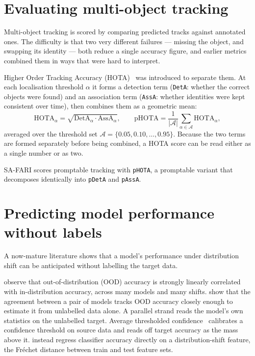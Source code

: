 \section{Evaluating multi-object tracking}
\label{sec:bg-hota}
Multi-object tracking is scored by comparing predicted tracks against annotated ones. The difficulty is that
two very different failures --- missing the object, and swapping its identity --- both reduce a single
accuracy figure, and earlier metrics combined them in ways that were hard to interpret.

Higher Order Tracking Accuracy (HOTA)~\cite{hota} was introduced to separate them. At each localisation
threshold $\alpha$ it forms a detection term (\texttt{DetA}: whether the correct objects were found) and an
association term (\texttt{AssA}: whether identities were kept consistent over time), then combines them as a
geometric mean:
\begin{equation}
  \mathrm{HOTA}_\alpha=\sqrt{\mathrm{DetA}_\alpha\cdot\mathrm{AssA}_\alpha},
  \qquad
  \mathrm{pHOTA}=\frac{1}{|\mathcal{A}|}\sum_{\alpha\in\mathcal{A}}\mathrm{HOTA}_\alpha ,
  \label{eq:phota}
\end{equation}
averaged over the threshold set $\mathcal{A}=\{0.05,0.10,\dots,0.95\}$. Because the two terms are formed
separately before being combined, a HOTA score can be read either as a single number or as two.

SA-FARI scores promptable tracking with \texttt{pHOTA}, a promptable variant that decomposes identically into
\texttt{pDetA} and \texttt{pAssA}.

\section{Predicting model performance without labels}
\label{sec:bg-predictable}
A now-mature literature shows that a model's performance under distribution shift can be anticipated without
labelling the target data.

\citet{aotl} observe that out-of-distribution (OOD) accuracy is strongly linearly correlated with
in-distribution accuracy, across many models and many shifts. \citet{agl} show that the agreement between a
pair of models tracks OOD accuracy closely enough to estimate it from unlabelled data alone. A parallel
strand reads the model's own statistics on the unlabelled target. Average thresholded confidence~\cite{atc}
calibrates a confidence threshold on source data and reads off target accuracy as the mass above it.
\citet{autoeval} instead regress classifier accuracy directly on a distribution-shift feature, the Fr\'echet
distance between train and test feature sets.

